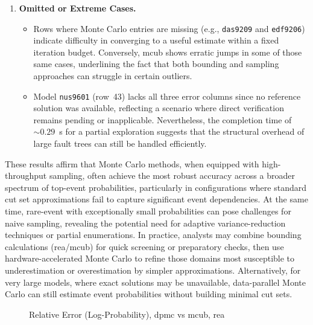 \begin{enumerate}
    \item \textbf{Omitted or Extreme Cases.}
    \begin{itemize}
        \item Rows where Monte Carlo entries are missing (e.g., \texttt{das9209} and \texttt{edf9206}) indicate difficulty in converging to a useful estimate within a fixed iteration budget. Conversely, \acrshort{mcub} shows erratic jumps in some of those same cases, underlining the fact that both bounding and sampling approaches can struggle in certain outliers.
        \item Model \texttt{nus9601} (row~43) lacks all three error columns since no reference solution was available, reflecting a scenario where direct verification remains pending or inapplicable. Nevertheless, the completion time of \(\sim 0.29\)~s for a partial exploration suggests that the structural overhead of large fault trees can still be handled efficiently.
    \end{itemize}
\end{enumerate}

These results affirm that Monte Carlo methods, when equipped with high-throughput sampling, often achieve the most robust accuracy across a broader spectrum of top-event probabilities, particularly in configurations where standard cut set approximations fail to capture significant event dependencies. At the same time, rare-event with exceptionally small probabilities can pose challenges for naive sampling, revealing the potential need for adaptive variance-reduction techniques or partial enumerations. In practice, analysts may combine bounding calculations (\acrshort{rea}/\acrshort{mcub}) for quick screening or preparatory checks, then use hardware-accelerated Monte Carlo to refine those domains most susceptible to underestimation or overestimation by simpler approximations. Alternatively, for very large models, where exact solutions may be unavailable, data-parallel Monte Carlo can still estimate event probabilities without building minimal cut sets. 

\begin{landscape}
\begin{figure}[p]
    \centering
    
    \caption{Relative Error (Log-Probability), \acrfull{dpmc} vs \acrfull{mcub}, \acrfull{rea}}
    \label{fig:canopy_rel_error_plot}
\end{figure}
\end{landscape}


